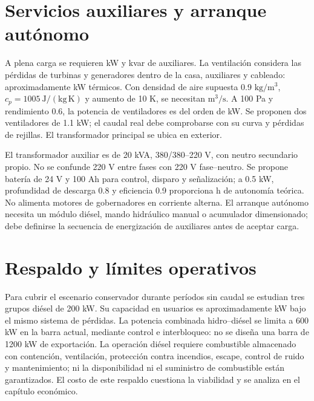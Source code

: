 \section{Servicios auxiliares y arranque autónomo}
\begingroup\small\endgroup
A plena carga se requieren  kW y  kvar de auxiliares. La ventilación considera las pérdidas de turbinas y generadores dentro de la casa, auxiliares y cableado: aproximadamente  kW térmicos. Con densidad de aire supuesta 0.9 \(\mathrm{kg/m^3}\), \(c_p=1005\ \mathrm{J/(kg\,K)}\) y aumento de 10 K, se necesitan  \(\mathrm{m^3/s}\). A 100 Pa y rendimiento 0.6, la potencia de ventiladores es del orden de  kW. Se proponen dos ventiladores de 1.1 kW; el caudal real debe comprobarse con su curva y pérdidas de rejillas. El transformador principal se ubica en exterior.

El transformador auxiliar es de 20 kVA, 380/380--220 V, con neutro secundario propio. No se confunde 220 V entre fases con 220 V fase--neutro. Se propone batería de 24 V y 100 Ah para control, disparo y señalización; a 0.5 kW, profundidad de descarga 0.8 y eficiencia 0.9 proporciona  h de autonomía teórica. No alimenta motores de gobernadores en corriente alterna. El arranque autónomo necesita un módulo diésel, mando hidráulico manual o acumulador dimensionado; debe definirse la secuencia de energización de auxiliares antes de aceptar carga.

\section{Respaldo y límites operativos}
Para cubrir el escenario conservador durante períodos sin caudal se estudian tres grupos diésel de 200 kW. Su capacidad en usuarios es aproximadamente  kW bajo el mismo sistema de pérdidas. La potencia combinada hidro--diésel se limita a 600 kW en la barra actual, mediante control e interbloqueo: no se diseña una barra de 1200 kW de exportación. La operación diésel requiere combustible almacenado con contención, ventilación, protección contra incendios, escape, control de ruido y mantenimiento; ni la disponibilidad ni el suministro de combustible están garantizados. El costo de este respaldo cuestiona la viabilidad y se analiza en el capítulo económico.
